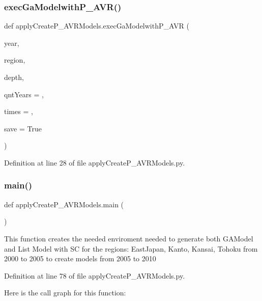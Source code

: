 \subsubsection{\texorpdfstring{exec\+Ga\+Modelwith\+P\+\_\+\+A\+V\+R()}{execGaModelwithP\_AVR()}}
{\footnotesize\ttfamily def apply\+Create\+P\+\_\+\+A\+V\+R\+Models.\+exec\+Ga\+Modelwith\+P\+\_\+\+A\+VR (\begin{DoxyParamCaption}\item[{}]{year,  }\item[{}]{region,  }\item[{}]{depth,  }\item[{}]{qnt\+Years = {},  }\item[{}]{times = {},  }\item[{}]{save = {\ttfamily True} }\end{DoxyParamCaption})}



Definition at line 28 of file apply\+Create\+P\+\_\+\+A\+V\+R\+Models.\+py.

\mbox{\label{namespaceapply_create_p___a_v_r_models_a3f91842d1a2b290ab21b5efefb59ba08}} 
\subsubsection{\texorpdfstring{main()}{main()}}
{\footnotesize\ttfamily def apply\+Create\+P\+\_\+\+A\+V\+R\+Models.\+main (\begin{DoxyParamCaption}{ }\end{DoxyParamCaption})}

\begin{DoxyVerb}This function creates the needed enviroment needed to generate both GAModel and List Model with SC
for the regions: EastJapan, Kanto, Kansai, Tohoku
from 2000 to 2005 to create models from 2005 to 2010
\end{DoxyVerb}
 

Definition at line 78 of file apply\+Create\+P\+\_\+\+A\+V\+R\+Models.\+py.

Here is the call graph for this function\+:
